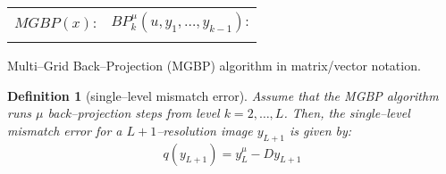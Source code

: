 \documentclass[letterpaper]{article}
\newtheorem{defn}{Definition}
\begin{document}
\begin{algorithm*}[th]
    \centering
    \begin{tabular}{ll}
        $MGBP(x)$: & $BP^{\mu}_{k}(u, y_1,\ldots,y_{k-1})$: \\

        \resizebox{.5\textwidth}{!}{
            \begin{minipage}{.6\textwidth}
                \begin{algorithmic}[1]
                    \REQUIRE Input image $x$.
                    \REQUIRE Integers $\mu\geqslant 0$ and $L\geqslant 1$.
                    \ENSURE Images $y_k$, $k = 2,\ldots,L$.

                    \STATE $y_1 = x$
                    \FOR{$k = 2,\ldots,L$}
                        \STATE $u = U y_{k-1}$
                        \STATE $y_{k} = BP^{\mu}_{k}\left(u, y_1,\ldots,y_{k-1} \right)$
                    \ENDFOR
                \end{algorithmic}
        \end{minipage}
        }
        &
        \resizebox{.5\textwidth}{!}{
            \begin{minipage}{0.6\textwidth}
                \begin{algorithmic}[1]
                    \REQUIRE Image $u$, level index $k$, number of steps $\mu$.
                    \REQUIRE Images $y_1,\ldots,y_{k-1}$ (only for $k>1$).
                    \ENSURE Updated image $u$

                    \IF{$k > 1$}
                        \FOR{$step = 1,\ldots,\mu$}
                            \STATE $d = BP^{\mu}_{k-1}\left( D u, y_1,\ldots,y_{k-2} \right)$
                            \STATE $u = u + U(y_{k-1} - d)$
                        \ENDFOR
                    \ENDIF
                \end{algorithmic}
            \end{minipage}
        }
    \end{tabular}
    \caption{Multi--Grid Back--Projection (MGBP) algorithm in matrix/vector notation.} \label{tab:alg}
    \label{alg:mgbp_classic}
\end{algorithm*}

\begin{defn}[single--level mismatch error]
    Assume that the MGBP algorithm runs $\mu$ back--projection steps from level $k=2,\ldots,L$. Then, the \emph{single--level mismatch error} for a $L+1$--resolution image $y_{L+1}$ is given by:
    \begin{equation}
        q(y_{L+1}) = y^\mu_L - D y_{L+1}
    \end{equation}
\end{defn}
\end{document}
